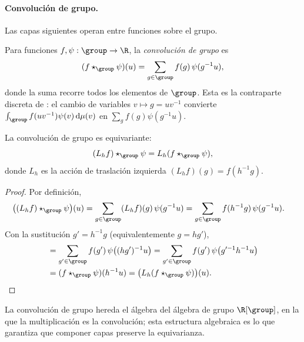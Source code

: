 \paragraph{Convoluci\'on de grupo.}
Las capas siguientes operan entre funciones sobre el grupo.

\begin{definition}
\label{def:groups:group-conv-layer}
Para funciones $f, \psi: \group \to \R$, la \emph{convoluci\'on de grupo} es
\begin{equation}
  (f \star_{\group} \psi)(u) = \sum_{g \in \group} f(g)\,\psi(g^{-1} u),
  \label{eq:groups:group-conv-discrete}
\end{equation}
donde la suma recorre todos los elementos de $\group$. Esta es la contraparte
discreta de : el cambio de variables
$v \mapsto g = uv^{-1}$ convierte $\int_{\group} f(uv^{-1})\psi(v)\,\Haar(v)$ en
$\sum_g f(g)\psi(g^{-1}u)$.
\end{definition}

\begin{theorem}
\label{thm:groups:group-conv-equivariance}
La convoluci\'on de grupo es equivariante:
\begin{equation}
  (L_h f) \star_{\group} \psi = L_h (f \star_{\group} \psi),
\end{equation}
donde $L_h$ es la acci\'on de traslaci\'on izquierda $(L_h f)(g) = f(h^{-1} g)$.
\end{theorem}

\begin{proof}
Por definici\'on,
\begin{align}
  \big((L_h f) \star_{\group} \psi\big)(u)
  &= \sum_{g \in \group} (L_h f)(g)\,\psi(g^{-1} u)
   = \sum_{g \in \group} f(h^{-1} g)\,\psi(g^{-1} u).
\end{align}
Con la sustituci\'on $g' = h^{-1} g$ (equivalentemente $g = h g'$),
\begin{align}
  &= \sum_{g' \in \group} f(g')\,\psi\big((h g')^{-1} u\big)
   = \sum_{g' \in \group} f(g')\,\psi\big(g'^{-1} h^{-1} u\big) \\
  &= (f \star_{\group} \psi)(h^{-1} u)
   = \big(L_h (f \star_{\group} \psi)\big)(u). \qedhere
\end{align}
\end{proof}

La convoluci\'on de grupo hereda el \'algebra del \'algebra de grupo
$\R[\group]$, en la que la multiplicaci\'on es la convoluci\'on; esta estructura
algebraica es lo que garantiza que componer capas preserve la equivarianza.

